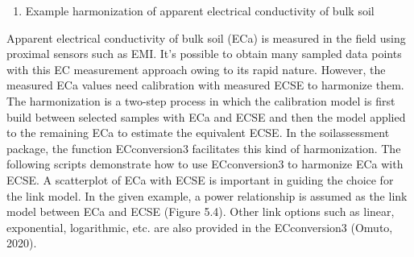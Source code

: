 \documentclass[
  10pt,
  b5paper,
]{book}
\newenvironment{Shaded}{\begin{snugshade}}{\end{snugshade}}
\newcommand{\CommentTok}[1]{\textcolor[rgb]{0.56,0.35,0.01}{\textit{#1}}}
\newcommand{\DataTypeTok}[1]{\textcolor[rgb]{0.13,0.29,0.53}{#1}}
\newcommand{\DecValTok}[1]{\textcolor[rgb]{0.00,0.00,0.81}{#1}}
\newcommand{\KeywordTok}[1]{\textcolor[rgb]{0.13,0.29,0.53}{\textbf{#1}}}
\newcommand{\NormalTok}[1]{#1}
\newcommand{\OperatorTok}[1]{\textcolor[rgb]{0.81,0.36,0.00}{\textbf{#1}}}
\newcommand{\StringTok}[1]{\textcolor[rgb]{0.31,0.60,0.02}{#1}}
\providecommand{\tightlist}{%
  \setlength{\itemsep}{0pt}\setlength{\parskip}{0pt}}
\begin{document}
\begin{Shaded}
\end{Shaded}

\begin{enumerate}
\def\labelenumi{(\arabic{enumi})}
\setcounter{enumi}{2}
\tightlist
\item
  Example harmonization of apparent electrical conductivity of bulk soil
\end{enumerate}

Apparent electrical conductivity of bulk soil (ECa) is measured in the field using proximal sensors such as EMI. It's possible to obtain many sampled data points with this EC measurement approach owing to its rapid nature. However, the measured ECa values need calibration with measured ECSE to harmonize them. The harmonization is a two-step process in which the calibration model is first build between selected samples with ECa and ECSE and then the model applied to the remaining ECa to estimate the equivalent ECSE. In the soilassessment package, the function ECconversion3 facilitates this kind of harmonization. The following scripts demonstrate how to use ECconversion3 to harmonize ECa with ECSE. A scatterplot of ECa with ECSE is important in guiding the choice for the link model. In the given example, a power relationship is assumed as the link model between ECa and ECSE (Figure 5.4). Other link options such as linear, exponential, logarithmic, etc. are also provided in the ECconversion3 (Omuto, 2020).
\end{document}
